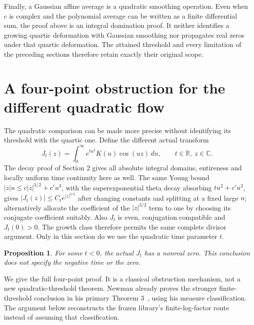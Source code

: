 \documentclass[11pt]{article}
\newtheorem{proposition}[theorem]{Proposition}
\theoremstyle{remark}\newtheorem{remark}[theorem]{Remark}
\newcommand{\R}{\mathbb R}\newcommand{\C}{\mathbb C}
\begin{document}
Finally, a Gaussian affine average is a quadratic smoothing operation.
Even when $c$ is complex and the polynomial average can be written as a
finite differential sum, the proof above is an integral domination proof.
It neither identifies a growing quartic deformation with Gaussian
smoothing nor propagates real zeros under that quartic deformation.
The attained threshold and every limitation of the preceding sections
therefore retain exactly their original scope.


\section{A four-point obstruction for the different quadratic flow}
The quadratic comparison can be made more precise without identifying
its threshold with the quartic one. Define the different actual transform
\[
 J_t(z)=\int_0^\infty e^{tu^2}K(u)\cos(uz)\,du,
 \qquad t\in\R,\ z\in\C.
\]
The decay proof of Section 2 gives all absolute integral domains,
entireness and locally uniform time continuity here as well. The same
Young bound $|z|u\leq c|z|^{3/2}+c'u^3$, with the superexponential
theta decay absorbing $tu^2+c'u^3$, gives
$|J_t(z)|\leq C_t e^{|z|^{3/2}}$ after changing constants and splitting
at a fixed large $u$; alternatively allocate the coefficient of the
$|z|^{3/2}$ term to one by choosing its conjugate coefficient suitably.
Also $J_t$ is even, conjugation compatible and $J_t(0)>0$.
The growth class therefore permits the same complete divisor argument.
Only in this section do we use the quadratic time parameter $t$.

\begin{proposition}\label{prop:quadraticnegative}
For some $t<0$, the actual $J_t$ has a nonreal zero.
This conclusion does not specify the negative time or the zero.
\end{proposition}
We give the full four-point proof. It is a classical obstruction
mechanism, not a new quadratic-threshold theorem. Newman already proves
the stronger finite-threshold conclusion in his primary
Theorem 3~\cite{newman}, using his measure classification. The argument
below reconstructs the frozen library's finite-log-factor route instead
of assuming that classification.
\end{document}
